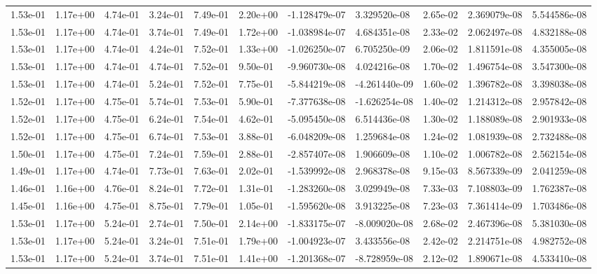 \begin{longtable}{| p{} | p{} |}
1.53e-01 & 1.17e+00 & 4.74e-01 & 3.24e-01 & 7.49e-01 & 2.20e+00 & -1.128479e-07 &  3.329520e-08 &  2.65e-02 &  2.369079e-08 &  5.544586e-08 \\
1.53e-01 & 1.17e+00 & 4.74e-01 & 3.74e-01 & 7.49e-01 & 1.72e+00 & -1.038984e-07 &  4.684351e-08 &  2.33e-02 &  2.062497e-08 &  4.832188e-08 \\
1.53e-01 & 1.17e+00 & 4.74e-01 & 4.24e-01 & 7.52e-01 & 1.33e+00 & -1.026250e-07 &  6.705250e-09 &  2.06e-02 &  1.811591e-08 &  4.355005e-08 \\
1.53e-01 & 1.17e+00 & 4.74e-01 & 4.74e-01 & 7.52e-01 & 9.50e-01 & -9.960730e-08 &  4.024216e-08 &  1.70e-02 &  1.496754e-08 &  3.547300e-08 \\
1.53e-01 & 1.17e+00 & 4.74e-01 & 5.24e-01 & 7.52e-01 & 7.75e-01 & -5.844219e-08 & -4.261440e-09 &  1.60e-02 &  1.396782e-08 &  3.398038e-08 \\
1.52e-01 & 1.17e+00 & 4.75e-01 & 5.74e-01 & 7.53e-01 & 5.90e-01 & -7.377638e-08 & -1.626254e-08 &  1.40e-02 &  1.214312e-08 &  2.957842e-08 \\
1.52e-01 & 1.17e+00 & 4.75e-01 & 6.24e-01 & 7.54e-01 & 4.62e-01 & -5.095450e-08 &  6.514436e-08 &  1.30e-02 &  1.188089e-08 &  2.901933e-08 \\
1.52e-01 & 1.17e+00 & 4.75e-01 & 6.74e-01 & 7.53e-01 & 3.88e-01 & -6.048209e-08 &  1.259684e-08 &  1.24e-02 &  1.081939e-08 &  2.732488e-08 \\
1.50e-01 & 1.17e+00 & 4.75e-01 & 7.24e-01 & 7.59e-01 & 2.88e-01 & -2.857407e-08 &  1.906609e-08 &  1.10e-02 &  1.006782e-08 &  2.562154e-08 \\
1.49e-01 & 1.17e+00 & 4.74e-01 & 7.73e-01 & 7.63e-01 & 2.02e-01 & -1.539992e-08 &  2.968378e-08 &  9.15e-03 &  8.567339e-09 &  2.041259e-08 \\
1.46e-01 & 1.16e+00 & 4.76e-01 & 8.24e-01 & 7.72e-01 & 1.31e-01 & -1.283260e-08 &  3.029949e-08 &  7.33e-03 &  7.108803e-09 &  1.762387e-08 \\
1.45e-01 & 1.16e+00 & 4.75e-01 & 8.75e-01 & 7.79e-01 & 1.05e-01 & -1.595620e-08 &  3.913225e-08 &  7.23e-03 &  7.361414e-09 &  1.703486e-08 \\
1.53e-01 & 1.17e+00 & 5.24e-01 & 2.74e-01 & 7.50e-01 & 2.14e+00 & -1.833175e-07 & -8.009020e-08 &  2.68e-02 &  2.467396e-08 &  5.381030e-08 \\
1.53e-01 & 1.17e+00 & 5.24e-01 & 3.24e-01 & 7.51e-01 & 1.79e+00 & -1.004923e-07 &  3.433556e-08 &  2.42e-02 &  2.214751e-08 &  4.982752e-08 \\
1.53e-01 & 1.17e+00 & 5.24e-01 & 3.74e-01 & 7.51e-01 & 1.41e+00 & -1.201368e-07 & -8.728959e-08 &  2.12e-02 &  1.890671e-08 &  4.533410e-08 \\

\end{longtable}
